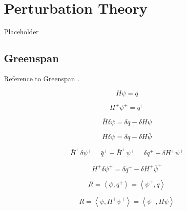 \section{Perturbation Theory}
\label{sec:bg:pert}

Placeholder

\subsection{Greenspan}
\label{sec:bg:pert:greenspan}

Reference to Greenspan \cite{greenspan}.

\begin{equation*}
  H\psi = q
\end{equation*}

\begin{equation*}
  H^+\psi^+ = q^+
\end{equation*}

\begin{equation*}
  \bar{H}\delta\psi = \delta q - \delta H\psi
\end{equation*}

\begin{equation*}
  H\delta\psi = \delta q - \delta H\bar{\psi}
\end{equation*}

\begin{equation*}
  \bar{H}^+\delta\psi^+ = \bar{q}^+ - \bar{H}^+\psi^+ = \delta q^+ - \delta H^+\psi^+
\end{equation*}

\begin{equation*}
  H^+\delta\psi^+ = \delta q^+ - \delta H^+\bar{\psi}^+
\end{equation*}

\begin{equation*}
  R = \left<\psi,q^+\right> = \left<\psi^+,q\right>
\end{equation*}

\begin{equation*}
  R = \left<\psi,H^+\psi^+\right> = \left<\psi^+,H\psi\right>
\end{equation*}

